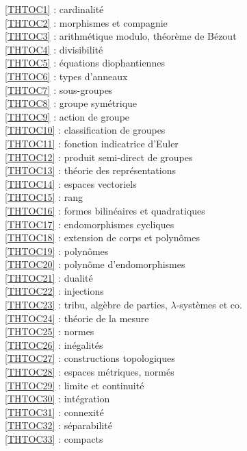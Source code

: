 \ref {THTOC1} : cardinalité\\
\ref {THTOC2} : morphismes et compagnie\\
\ref {THTOC3} : arithmétique modulo, théorème de Bézout\\
\ref {THTOC4} : divisibilité\\
\ref {THTOC5} : équations diophantiennes\\
\ref {THTOC6} : types d'anneaux\\
\ref {THTOC7} : sous-groupes\\
\ref {THTOC8} : groupe symétrique\\
\ref {THTOC9} : action de groupe\\
\ref {THTOC10} : classification de groupes\\
\ref {THTOC11} : fonction indicatrice d'Euler\\
\ref {THTOC12} : produit semi-direct de groupes\\
\ref {THTOC13} : théorie des représentations\\
\ref {THTOC14} : espaces vectoriels\\
\ref {THTOC15} : rang\\
\ref {THTOC16} : formes bilinéaires et quadratiques\\
\ref {THTOC17} : endomorphismes cycliques\\
\ref {THTOC18} : extension de corps et polynômes\\
\ref {THTOC19} : polynômes\\
\ref {THTOC20} : polynôme d'endomorphismes\\
\ref {THTOC21} : dualité\\
\ref {THTOC22} : injections\\
\ref {THTOC23} : tribu, algèbre de parties, \( \lambda \)-systèmes et co.\\
\ref {THTOC24} : théorie de la mesure\\
\ref {THTOC25} : normes\\
\ref {THTOC26} : inégalités\\
\ref {THTOC27} : constructions topologiques\\
\ref {THTOC28} : espaces métriques, normés\\
\ref {THTOC29} : limite et continuité\\
\ref {THTOC30} : intégration\\
\ref {THTOC31} : connexité\\
\ref {THTOC32} : séparabilité\\
\ref {THTOC33} : compacts\\
